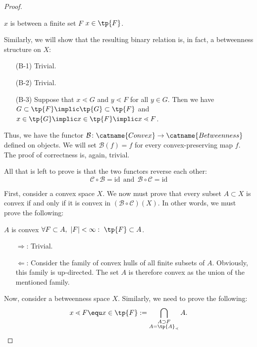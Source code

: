 \documentclass[12pt, a4paper]{article}
\newcommand{\btw}{\lessdot}
\begin{document}
\begin{proof}
\begin{itemize}
    \begin{center}
        \(x\) is between a finite set \(F\) \Equ \(x \in \tp{F}\).
    \end{center}

    Similarly, we will show that the resulting binary relation is, in fact, a betweenness structure on \(X\):

    \begin{itemize}
        \item[(B-1)] Trivial.
        \item[(B-2)] Trivial.
        \item[(B-3)] Suppose that \(x \btw G\) and \(y \btw F\) for all \(y \in G\). Then we have \(G \subset \tp{F} \implic \tp{G} \subset \tp{F}\) and \(x \in \tp{G} \implic x \in \tp{F} \implic x \btw F\).
    \end{itemize}

    Thus, we have the functor \(\mathcal{B} \colon \catname{Convex} \to \catname{Betweenness}\) defined on objects. We will set \(\mathcal{B}(f) = f\) for every convex-preserving map \(f\). The proof of correctness is, again, trivial.
\end{itemize}

All that is left to prove is that the two functors reverse each other: \[\mathcal{C} \circ \mathcal{B} = \mathrm{id} \ \ \mbox{and} \ \ \mathcal{B} \circ \mathcal{C} = \mathrm{id}\]

First, consider a convex space \(X\). We now must prove that every subset \(A \subset X\) is convex if and only if it is convex in \((\mathcal{B} \circ \mathcal{C})(X)\). In other words, we must prove the following:

\begin{center}
    \(A\) is convex \Equ \(\forall F \subset A, \ |F| < \infty: \ \tp{F} \subset A\).
\end{center}

\begin{itemize}
    \item[\(\Longrightarrow\):] Trivial.
    \item[\(\Longleftarrow\):] Consider the family of convex hulls of all finite subsets of \(A\). Obviously, this family is up-directed. The set \(A\) is therefore convex as the union of the mentioned family.
\end{itemize}

Now, consider a betweenness space \(X\). Similarly, we need to prove the following: \[x \btw F \equ x \in \tp{F} := \bigcap\limits_{\substack{A \supset F \\ A = \tp{A}_\btw}} A .\]


\end{proof}
\end{document}
